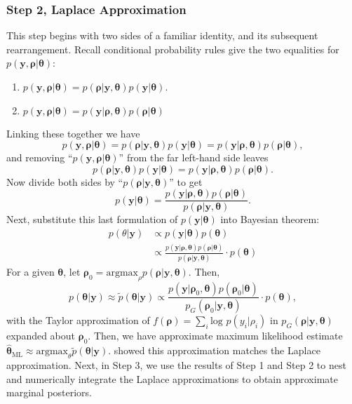 \subsubsection{Step 2, Laplace Approximation}  %

This step begins with two sides of a familiar identity, and its subsequent rearrangement. Recall conditional probability rules give the two equalities for $p(\pmb{y} , \pmb{\rho} | \pmb{\theta})$:
\begin{enumerate}
\item $p(\pmb{y} , \pmb{\rho} | \pmb{\theta}) = p(\pmb{\rho} | \pmb{y}, \pmb{\theta}) p(\pmb{y} | \pmb{\theta})$. 
\item $p(\pmb{y} , \pmb{\rho} | \pmb{\theta}) = p(\pmb{y} | \pmb{\rho}, \pmb{\theta}) p(\pmb{\rho} | \pmb{\theta})$
\end{enumerate} 
Linking these together we have
$$ p(\pmb{y} , \pmb{\rho} | \pmb{\theta}) = p(\pmb{\rho} | \pmb{y}, \pmb{\theta}) p(\pmb{y} | \pmb{\theta}) = p(\pmb{y} | \pmb{\rho}, \pmb{\theta}) p(\pmb{\rho} | \pmb{\theta}),$$
and removing ``$p(\pmb{y} , \pmb{\rho} | \pmb{\theta})$'' from the far left-hand side leaves
$$ p(\pmb{\rho} | \pmb{y}, \pmb{\theta}) p(\pmb{y} | \pmb{\theta}) = p(\pmb{y} | \pmb{\rho}, \pmb{\theta}) p(\pmb{\rho} | \pmb{\theta}). $$
Now divide both sides by ``$p(\pmb{\rho} | \pmb{y}, \pmb{\theta})$'' to get 
\begin{equation}
p(\pmb{y} | \pmb{\theta}) = \frac{p(\pmb{y} | \pmb{\rho}, \pmb{\theta}) p(\pmb{\rho} | \pmb{\theta})} {p(\pmb{\rho} | \pmb{y}, \pmb{\theta})}.
\end{equation}
Next, substitute this last formulation of $p(\pmb{y}|\pmb{\theta})$ into Bayesian theorem:
\begin{align}
p(\theta|\pmb{y}) & \propto p(\pmb{y}|\pmb{\theta})p(\pmb{\theta}) \nonumber \\
& \propto \frac{p(\pmb{y} | \pmb{\rho}, \pmb{\theta}) p(\pmb{\rho} | \pmb{\theta})}{p(\pmb{\rho} | \pmb{y}, \pmb{\theta})} \cdot p(\pmb{\theta})
\end{align}
For a given $\pmb{\theta}$, let $\pmb{\rho}_{0} = \text{argmax}_{\rho}p(\pmb{\rho}|\pmb{y},\pmb{\theta})$. Then,
\begin{equation} \label{eq:la}
p(\pmb{\theta}|\pmb{y}) \approx \tilde{p}(\pmb{\theta}|\pmb{y}) \propto  \frac{p(\pmb{y} | \pmb{\rho}_{0}, \pmb{\theta}) p(\pmb{\rho}_{0} | \pmb{\theta})}{p_{G}(\pmb{\rho}_{0} | \pmb{y}, \pmb{\theta})} \cdot p(\pmb{\theta}),
\end{equation}
with the Taylor approximation of $f(\pmb{\rho}) = \sum_{i} \text{log }p(y_{i}|\rho_{i})$ in $p_{G}(\pmb{\rho} | \pmb{y}, \pmb{\theta})$ expanded about $\pmb{\rho}_{0}$. Then, we have approximate maximum likelihood estimate $\hat{\pmb{\theta}}_{\text{ML}} \approx \text{argmax}_{\theta} \tilde{p}(\pmb{\theta}|\pmb{y})$. \cite{Tierney1986} showed this approximation matches the Laplace approximation. 
Next, in Step 3, we use the results of Step 1 and Step 2 to nest and numerically integrate the Laplace approximations to obtain approximate marginal posteriors.

